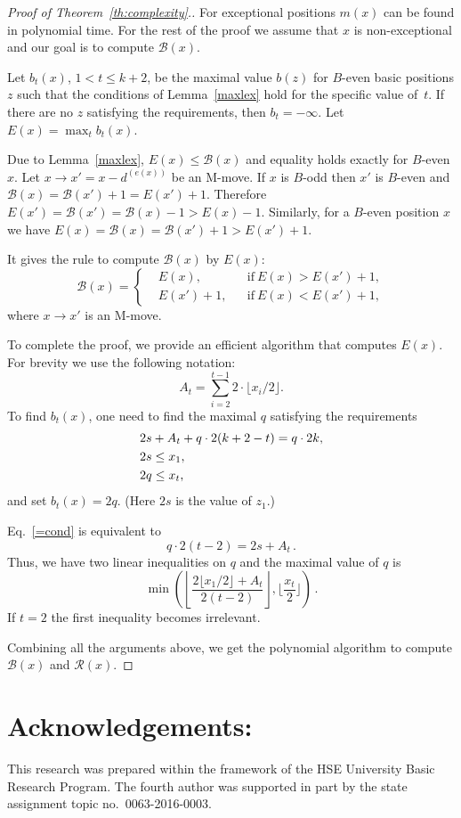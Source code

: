\documentclass{article}
\theoremstyle{definition}
\def\mv#1{d^{(#1)}}
\def\B{\mathcal{B}}
\def\R{\mathcal{R}}
\begin{document}
\begin{proof}[Proof of Theorem~\ref{th:complexity}.]
  For exceptional positions $m(x)$ can be found in polynomial time. For the rest of the proof  we assume that $x$  is non-exceptional and our goal is to compute $\B(x)$.
  
  Let $b_{t}(x)$, $1<t\leq k+2$, be the maximal value $b(z)$ for $B$-even basic positions $z$ such that the conditions of Lemma~\ref{maxlex} hold for the specific value of~$t$.
  If there are no $z$ satisfying the requirements, then $b_{t} = -\infty$.
Let $E(x) = \max_{t} b_{t}(x)$.

Due to Lemma~\ref{maxlex},  $E(x)\leq \B(x)$  and equality holds exactly for $B$-even $x$. 
Let $x\to x' = x-\mv{e(x)} $ be an M-move.  If $x$ is $B$-odd  then  $x'$ is $B$-even and $\B(x) = \B(x')+1 = E(x')+1$. Therefore $E(x')=\B(x') = \B(x)-1> E(x)-1$. Similarly, for a $B$-even position $x$ we have $E(x)=\B(x) = \B(x')+1> E(x')+1 $.

It gives the rule to compute $\B(x)$ by $E(x)$:
\[
\B(x) =\left\{\begin{aligned}
  &E(x), &&\text{if}\ E(x)> E(x')+1,\\
  &E(x')+1, &&\text{if}\ E(x)< E(x')+1,
\end{aligned}\right.
\]
where $x\to x'$ is an M-move.
  
To complete the proof, we provide an efficient algorithm that computes $E(x)$. 
For brevity we use the following notation: 
\[
A_t = \sum_{i=2}^{t-1}2\cdot\lfloor x_i/2\rfloor .
\]
To find $b_{t}(x)$, one need to find the maximal $q$ satisfying the requirements
\begin{align}
  &2s + A_{t} + q\cdot 2(k+2-t) = q\cdot 2k,\label{=cond}\\
  &2s\leq x_1,\notag\\
  &2q\leq x_{t},\notag 
\end{align}
and set $b_{t}(x) =2q $. (Here $2s$ is the value of $z_1$.)

Eq.~\eqref{=cond} is equivalent to
\[
q\cdot 2(t-2) = 2s+ A_t\,.
\]
Thus, we have two linear inequalities on  $q$ and the maximal value of $q$ is
\[
\min\left(
\left\lfloor
\frac{2\lfloor x_1/2\rfloor+A_t}{2(t-2)}
\right\rfloor,
\lfloor \frac{x_{t}}2\rfloor
\right)\,.
\]
If $t=2$ the first inequality becomes irrelevant.

Combining all the arguments above, we get the polynomial algorithm to compute $\B(x)$ and $\R(x)$.
\end{proof}

\section*{Acknowledgements:} 
This research was prepared within the framework 
of the HSE University Basic Research Program.  
The fourth  author was supported in part 
by the state assignment topic no.~0063-2016-0003.
\end{document}
